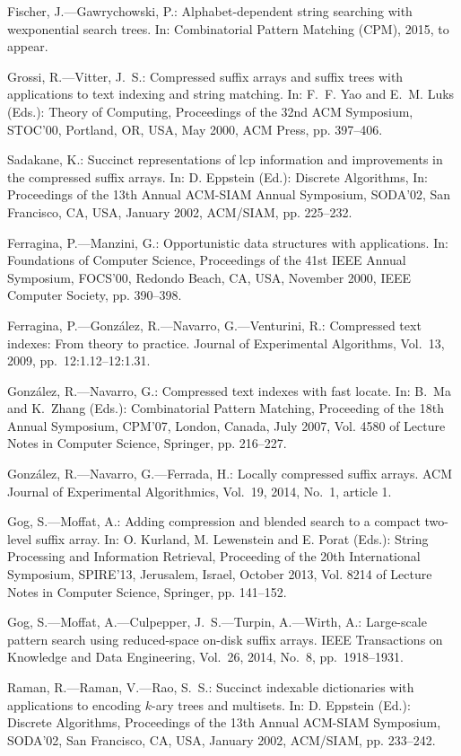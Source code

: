 \documentclass{cai}
\begin{document}
\begin{thebibliography}{99}
Fischer, J.---Gawrychowski, P.: Alphabet-dependent string searching with
  wexponential search trees. In: Combinatorial Pattern Matching (CPM), 2015, to appear.

Grossi, R.---Vitter, J.~S.: Compressed suffix arrays and suffix trees with
  applications to text indexing and string matching. 
  In: F.~F. Yao and E.~M. Luks (Eds.):
  Theory of Computing,
  Proceedings of the 32nd ACM Symposium, STOC'00, Portland, OR, USA, May 2000,
  ACM Press, pp. 397--406.

Sadakane, K.: Succinct representations of lcp information and improvements in
  the compressed suffix arrays. 
  In: D. Eppstein (Ed.):
  Discrete Algorithms,
  In: Proceedings of the 13th Annual ACM-SIAM Annual Symposium, SODA'02, San Francisco, CA, USA, January 2002,
  ACM/SIAM, pp. 225--232.

Ferragina, P.---Manzini, G.: Opportunistic data structures with applications. 
  In: Foundations of Computer Science,
  Proceedings of the 41st IEEE Annual Symposium, FOCS'00, Redondo Beach, CA, USA, November 2000,
  IEEE Computer Society, pp. 390--398.

Ferragina, P.---Gonz{\'a}lez, R.---Navarro, G.---Venturini, R.: Compressed text
  indexes: From theory to practice. Journal of Experimental Algorithms, Vol.~13, 2009, pp.~12:1.12--12:1.31.

Gonz{\'a}lez, R.---Navarro, G.: Compressed text indexes with fast locate. 
  In: B.~Ma and K.~Zhang (Eds.):
  Combinatorial Pattern Matching,
  Proceeding of the 18th Annual Symposium, CPM'07, London, Canada, July 2007,
  Vol. 4580 of Lecture Notes in Computer Science, Springer, pp. 216--227.

Gonz{\'a}lez, R.---Navarro, G.---Ferrada, H.: Locally compressed suffix arrays. 
  ACM Journal of Experimental Algorithmics, Vol.~19, 2014, No.~1, article 1.

Gog, S.---Moffat, A.: Adding compression and blended search to a compact two-level
  suffix array.
  In: O. Kurland, M. Lewenstein and E. Porat (Eds.):  
  String Processing and Information Retrieval, 
  Proceeding of the 20th International Symposium, SPIRE'13, Jerusalem, Israel, October 2013,
  Vol. 8214 of Lecture Notes in Computer Science, Springer, pp. 141--152.

Gog, S.---Moffat, A.---Culpepper, J.~S.---Turpin, A.---Wirth, A.: Large-scale pattern search using reduced-space on-disk suffix arrays. IEEE Transactions on
  Knowledge and Data Engineering, Vol.~26, 2014, No.~8, pp.~1918--1931.

Raman, R.---Raman, V.---Rao, S.~S.: Succinct indexable dictionaries with
  applications to encoding $k$-ary trees and multisets. 
  In: D. Eppstein (Ed.):
  Discrete Algorithms,
  Proceedings of the 13th Annual ACM-SIAM Symposium, SODA'02, San Francisco, CA, USA, January 2002,
  ACM/SIAM, pp. 233--242.

\end{thebibliography}



\label{lastpage}
\end{document}
